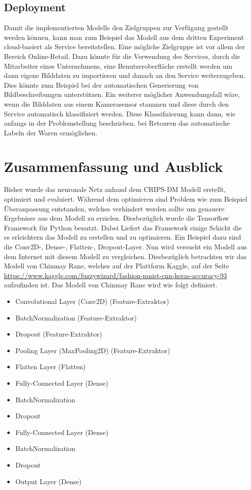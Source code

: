 \documentclass[12pt]{scrreprt}
\begin{document}
\section{Deployment}\label{dp:dp}

Damit die implementierten Modelle den Zielgruppen zur Verfügung gestellt werden können, kann man zum Beispiel das Modell aus dem dritten Experiment cloud-basiert als Service bereitstellen. Eine mögliche Zielgruppe ist vor allem der Bereich Online-Retail. Dazu könnte für die Verwendung des Services, durch die Mitarbeiter eines Unternehmens, eine Benutzeroberfläche erstellt werden um dann eigene Bilddaten zu importieren und danach an den Service weiterzugeben. Dies könnte zum Beispiel bei der automatischen Generierung von Bildbeschreibungen unterstützen. Ein weiterer möglicher Anwendungsfall wäre, wenn die Bilddaten aus einem Kamerasensor stammen und diese durch den Service automatisch klassifiziert werden. Diese Klassifizierung kann dann, wie anfangs in der Problemstellung beschrieben, bei Retouren das automatische Labeln der Waren ermöglichen. 

\newpage
\chapter{Zusammenfassung und Ausblick}\label{zsm:zsm}


Bisher wurde das neuronale Netz anhand dem CRIPS-DM Modell erstellt, optimiert und evaluiert. Während dem optimieren sind Problem wie zum Beispiel Überanpassung entstanden, welches verhindert werden sollte um genauere Ergebnisse aus dem Modell zu erzielen. Diesbezüglich wurde die Tensorflow Framework für Python benutzt. Dabei Liefert das Framework einige Schicht die es erleichtern das Modell zu erstellen und zu optimieren. Ein Beispiel dazu sind die Conv2D-, Dense-, Flatten-, Dropout-Layer. Nun wird versucht ein Modell aus dem Internet mit diesem Modell zu vergleichen. Diesbezüglich betrachten wir das Modell von Chinmay Rane, welches auf der Plattform Kaggle, auf der Seite \url{https://www.kaggle.com/fuzzywizard/fashion-mnist-cnn-keras-accuracy-93} aufzufinden ist. Das Modell von Chinmay Rane wird wie folgt definiert. 

\begin{itemize}
	\item Convolutional Layer (Conv2D) (Feature-Extraktor)
	\item BatchNormalization (Feature-Extraktor)
	\item Dropout (Feature-Extraktor)
	\item Pooling Layer (MaxPooling2D) (Feature-Extraktor)
	\item Flatten Layer (Flatten)
	\item Fully-Connected Layer (Dense)
	\item BatchNormalization
	\item Dropout
	\item Fully-Connected Layer (Dense)
	\item BatchNormalization
	\item Dropout
	\item Output Layer (Dense)
	\label{tab:modelvonChinmayRane}
\end{itemize}
\end{document}
